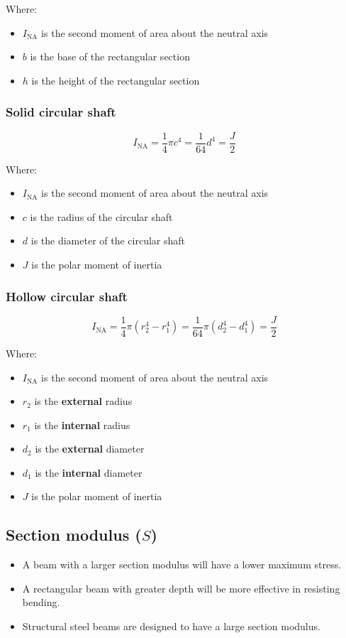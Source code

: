 \documentclass[11pt]{article}
\begin{document}
Where:
\begin{itemize}
\item \(I_{\text{NA}}\) is the second moment of area about the neutral axis
\item \(b\) is the base of the rectangular section
\item \(h\) is the height of the rectangular section
\end{itemize}
\subsubsection{Solid circular shaft}
\label{sec:org546104a}
\[I_{\text{NA}} = \frac{1}{4}\pi c^4 = \frac{1}{64}d^4 = \frac{J}{2}\]

Where:
\begin{itemize}
\item \(I_{\text{NA}}\) is the second moment of area about the neutral axis
\item \(c\) is the radius of the circular shaft
\item \(d\) is the diameter of the circular shaft
\item \(J\) is the polar moment of inertia
\end{itemize}
\subsubsection{Hollow circular shaft}
\label{sec:org80e11c6}
\[I_{\text{NA}} = \frac{1}{4}\pi \left(r_2^4 - r_1^4 \right) = \frac{1}{64}\pi \left(d_2^4 - d_1^4 \right) = \frac{J}{2}\]

Where:
\begin{itemize}
\item \(I_{\text{NA}}\) is the second moment of area about the neutral axis
\item \(r_2\) is the \textbf{external} radius
\item \(r_1\) is the \textbf{internal} radius
\item \(d_2\) is the \textbf{external} diameter
\item \(d_1\) is the \textbf{internal} diameter
\item \(J\) is the polar moment of inertia
\end{itemize}
\subsection{Section modulus (\(S\))}
\label{sec:org018f8f9}
\begin{itemize}
\item A beam with a larger section modulus will have a lower maximum stress.
\item A rectangular beam with greater depth will be more effective in resisting bending.
\item Structural steel beams are designed to have a large section modulus.
\end{itemize}
\end{document}
